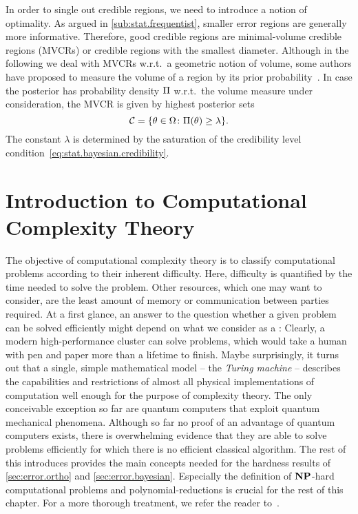 In order to single out  credible regions, we need to introduce a notion of optimality.
As argued in \cref{sub:stat.frequentist}, smaller error regions are generally more informative.
Therefore, good credible regions are minimal-volume credible regions (MVCRs) or credible regions with the smallest diameter.
Although in the following we deal with MVCRs w.r.t.\ a geometric notion of volume, some authors have proposed to measure the volume of a region by its prior probability~\cite{Evans_2006_Optimally,Shang_2013_Optimal}.
In case the posterior has probability density $\Pi$ w.r.t.\ the volume measure under consideration, the MVCR is given by highest posterior sets~\cite{Ferrie_2014_High}
\[
  \label{eq:stat.bayesian.mvcr}
  \mathcal{C} = \{ \theta \in \Omega\colon \Pi(\theta) \ge \lambda \}.
\]
The constant $\lambda$ is determined by the saturation of the credibility level condition~\eqref{eq:stat.bayesian.credibility}.




\section{Introduction to Computational Complexity Theory}
\label{sec:error.complexity}


The objective of computational complexity theory is to classify computational problems according to their inherent difficulty.
Here, difficulty is quantified by the time needed to solve the problem.
Other resources, which one may want to consider, are the least amount of memory or communication between parties required.
At a first glance, an answer to the question whether a given problem can be solved efficiently might depend on what we consider as a :
Clearly, a modern high-performance cluster can solve problems, which would take a human with pen and paper more than a lifetime to finish.
Maybe surprisingly, it turns out that a single, simple mathematical model -- the \emph{Turing machine} -- describes the capabilities and restrictions of almost all physical implementations of computation well enough for the purpose of complexity theory.
The only conceivable exception so far are quantum computers that exploit quantum mechanical phenomena.
Although so far no proof of an advantage of quantum computers exists, there is overwhelming evidence that they are able to solve problems efficiently for which there is no efficient classical algorithm.
The rest of this introduces provides the main concepts needed for the hardness results of \cref{sec:error.ortho} and \ref{sec:error.bayesian}.
Especially the definition of $\mathbf{NP}$-hard computational problems and polynomial-reductions is crucial for the rest of this chapter.
For a more thorough treatment, we refer the reader to~\cite{Arora_2009_Computational,Garey_2002_Computers}.

